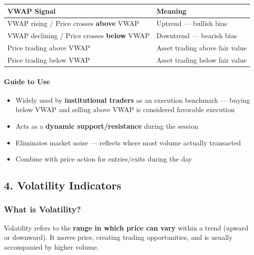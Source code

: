 \documentclass[12pt,openany]{book}
\begin{document}
\begin{center}
\small
\renewcommand{\arraystretch}{1.2}
\begin{tabular}{|L{0.30\textwidth}|L{0.60\textwidth}|}
\hline
 \textbf{VWAP Signal} & \textbf{Meaning} \\ \hline
 VWAP rising / Price crosses \textbf{above} VWAP & Uptrend --- bullish bias \\ \hline
 VWAP declining / Price crosses \textbf{below} VWAP & Downtrend --- bearish bias \\ \hline
 Price trading above VWAP & Asset trading above fair value \\ \hline
 Price trading below VWAP & Asset trading below fair value \\ \hline
\end{tabular}
\end{center}

\paragraph{Guide to Use}
\begin{itemize}[leftmargin=*]
    \item Widely used by \textbf{institutional traders} as an execution benchmark --- buying below VWAP and selling above VWAP is considered favorable execution
    \item Acts as a \textbf{dynamic support/resistance} during the session
    \item Eliminates market noise --- reflects where most volume actually transacted
    \item Combine with price action for entries/exits during the day
\end{itemize}

\subsection{4. Volatility Indicators}

\subsubsection{What is Volatility?}

Volatility refers to the \textbf{range in which price can vary} within a trend (upward or downward). It moves price, creating trading opportunities, and is usually accompanied by higher volume.
\end{document}

